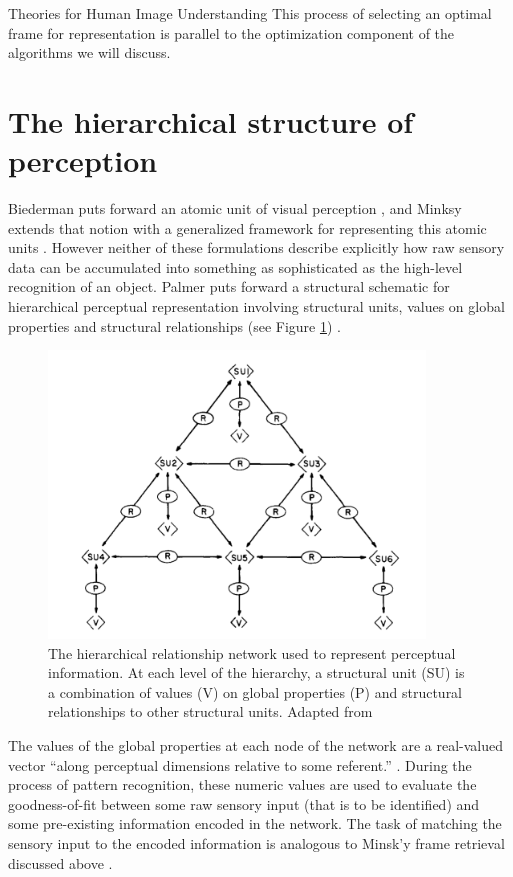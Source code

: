 \documentclass[12pt]{pom_thesis}
\begin{document}
\begin{chapter}{Theories for Human Image Understanding}
This process of selecting an optimal frame for representation is parallel to the optimization component of the algorithms we will discuss.  
\section{The hierarchical structure of perception}
Biederman puts forward an atomic unit of visual perception \cite{biederman1987recognition}, and Minksy extends that notion with a generalized framework for representing this atomic units \cite{minsky1975framework}. However neither of these formulations describe explicitly how raw sensory data can be accumulated into something as sophisticated as the high-level recognition of an object. Palmer puts forward a structural schematic for hierarchical perceptual representation involving structural units, values on global properties and structural relationships (see Figure \ref{fig:palmer}) \cite{palmer1977hierarchical}. 
\begin{figure}[h]
	\label{fig:palmer}
	\centering
	\includegraphics[width=10cm]{palmer_tree}
	\caption{The hierarchical relationship network used to represent perceptual information. At each level of the hierarchy, a structural unit (SU) is a combination of values (V) on global properties (P) and structural relationships to other structural units.  Adapted from \cite{palmer1977hierarchical}}
\end{figure}
The values of the global properties at each node of the network are a real-valued vector ``along perceptual dimensions relative to some referent.'' \cite{palmer1977hierarchical}. During the process of pattern recognition, these numeric values are used to evaluate the goodness-of-fit between some raw sensory input (that is to be identified) and some pre-existing information encoded in the network. The task of matching the sensory input to the encoded information is analogous to Minsk'y frame retrieval discussed above \cite{minsky1975framework}.

\end{chapter}
\end{document}
